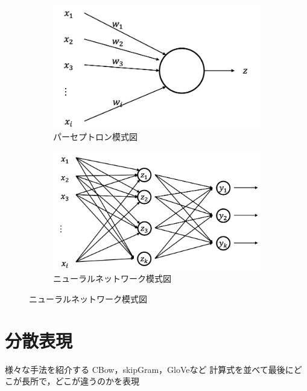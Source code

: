\documentclass[a4j,11pt,report]{jsbook}
\begin{document}
\begin{figure}[ht]
  \centering
  \begin{subfigure}{0.4\columnwidth }
    \centering
    \includegraphics[width=\columnwidth ]{image/NeuralNet_parceptron.png}
    \caption{パーセプトロン模式図}
    \label{fig:parceptron_image}
  \end{subfigure}

  \begin{subfigure}{0.4\columnwidth }
    \centering
    \includegraphics[width=\columnwidth]{image/forwardNeuralNetwork.png}
    \caption{ニューラルネットワーク模式図}
    \label{fig:NeuralNet_image}

  \end{subfigure}

\end{figure}


\section{分散表現}
様々な手法を紹介する
CBow，skipGram，GloVeなど
計算式を並べて最後にどこが長所で，どこが違うのかを表現
\end{document}
